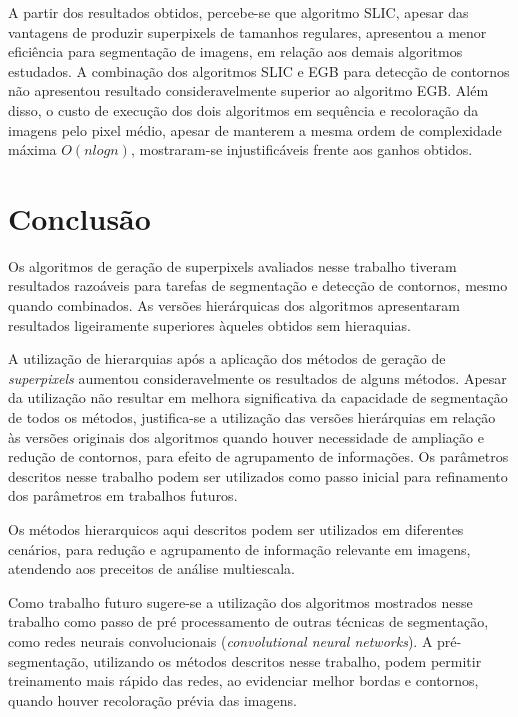 \begin{document}
A partir dos resultados obtidos, percebe-se que algoritmo SLIC, apesar das vantagens de produzir superpixels de tamanhos regulares, apresentou a menor eficiência para segmentação de imagens, em relação aos demais algoritmos estudados. A combinação dos algoritmos SLIC e EGB para detecção de contornos não apresentou resultado consideravelmente superior ao algoritmo EGB. Além disso, o custo de execução dos dois algoritmos em sequência e recoloração da imagens pelo pixel médio, apesar de manterem a mesma ordem de complexidade máxima $O(nlogn)$, mostraram-se injustificáveis frente aos ganhos obtidos.



\section{Conclusão} \label{sec:conclusao}

Os algoritmos de geração de superpixels avaliados nesse trabalho tiveram resultados razoáveis para tarefas de segmentação e detecção de contornos, mesmo quando combinados. As versões hierárquicas dos algoritmos apresentaram resultados ligeiramente superiores àqueles obtidos sem hieraquias.

A utilização de hierarquias após a aplicação dos métodos de geração de \textit{superpixels} aumentou consideravelmente os resultados de alguns métodos. Apesar da utilização não resultar em melhora significativa da capacidade de segmentação de todos os métodos, justifica-se a utilização das versões hierárquias em relação às versões originais dos algoritmos quando houver necessidade de ampliação e redução de contornos, para efeito de agrupamento de informações. Os parâmetros descritos nesse trabalho podem ser utilizados como passo inicial para refinamento dos parâmetros em trabalhos futuros.

Os métodos hierarquicos aqui descritos podem ser utilizados em diferentes cenários, para redução e agrupamento de informação relevante em imagens, atendendo aos preceitos de análise multiescala. 

Como trabalho futuro sugere-se a utilização dos algoritmos mostrados nesse trabalho como passo de pré processamento de outras técnicas de segmentação, como redes neurais convolucionais (\textit{convolutional neural networks}). A pré-segmentação, utilizando os métodos descritos nesse trabalho, podem permitir treinamento mais rápido das redes, ao evidenciar melhor bordas e contornos, quando houver recoloração prévia das imagens. %




\end{document}
